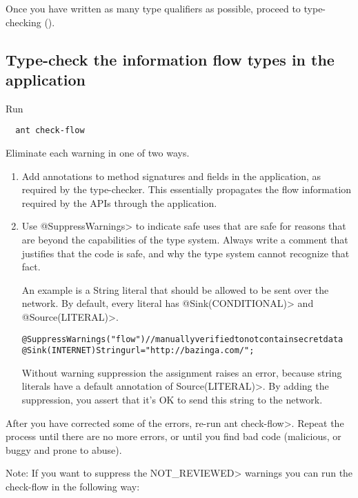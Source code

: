 Once you have written as many type qualifiers as possible, proceed to
type-checking ().



\subsection{Type-check the information flow types in the application\label{sec:run-type-checker}}

Run

\begin{Verbatim}
  ant check-flow
\end{Verbatim}

Eliminate each warning in one of two ways.
\begin{enumerate}
\item Add annotations to method signatures and fields in the application, as
required by the type-checker. This essentially propagates the flow
information required by the APIs through the application.

\item Use \<@SuppressWarnings> to indicate safe uses that are safe for reasons
that are beyond the capabilities of the type system. Always write a
comment that justifies that the code is safe, and why the type system
cannot recognize that fact.

An example is a String literal that should be allowed to be sent
over the network. By default, every literal has \<@Sink(CONDITIONAL)> 
and \<@Source(LITERAL)>.

\begin{alltt}
    @SuppressWarnings("flow") // manually verified to not contain secret data
    @Sink(INTERNET) String url = "http://bazinga.com/";
\end{alltt}

Without warning suppression the assignment raises an error, because string literals
have a default annotation of \<Source(LITERAL)>. By adding the suppression, you
assert that it's OK to send this string to the network. 

\end{enumerate}

After you have corrected some of the errors, re-run \<ant check-flow>.
Repeat the process until there are no more errors, or until you find bad
code (malicious, or buggy and prone to abuse).

Note: If you want to suppress the \<NOT\_REVIEWED> warnings you can run the check-flow
in the following way:

